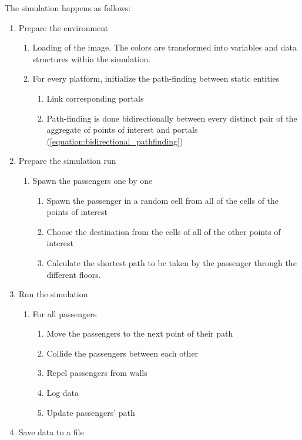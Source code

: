 The simulation happens as follows:
\begin{enumerate}
    \item Prepare the environment
    \begin{enumerate}
    \item Loading of the image. The colors are transformed into variables and data structures within the simulation.
    \item For every platform, initialize the path-finding between static entities
        \begin{enumerate}
            \item Link corresponding portals
            \item Path-finding is done bidirectionally between every distinct pair of the aggregate of points of interest and portals (\autoref{equation:bidirectional_pathfinding}) \\
        \end{enumerate}
            \end{enumerate}
    \item Prepare the simulation run
    \begin{enumerate}
        \item Spawn the passengers one by one
            \begin{enumerate}
                \item Spawn the passenger in a random cell from all of the cells of the points of interest
                \item Choose the destination from the cells of all of the other points of interest
                \item Calculate the shortest path to be taken by the passenger through the different floors.
            \end{enumerate}
    \end{enumerate}
    \item Run the simulation
    \begin{enumerate}
        \item For all passengers
        \begin{enumerate}
            \item Move the passengers to the next point of their path
            \item Collide the passengers between each other
            \item Repel passengers from walls
            \item Log data
            \item Update passengers' path
        \end{enumerate}
    \end{enumerate}
    \item Save data to a file
\end{enumerate}

